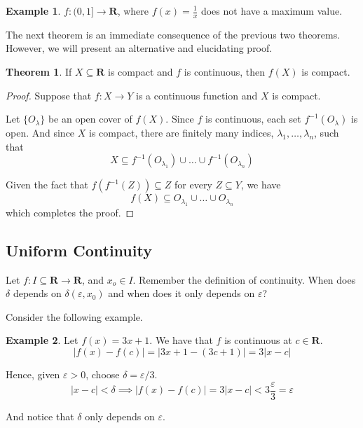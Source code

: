 \documentclass[12pt,a4paper]{article}
\theoremstyle{definition}
\newtheorem{theorem}{Theorem}[section]
\newtheorem{example}{Example}[section]
\begin{document}
\begin{example}
	$f:(0,1] \longrightarrow \textbf{R}$, where $f(x) = \frac{1}{x}$ does not have a maximum value.
\end{example}

The next theorem is an immediate consequence of the previous two theorems. However, we will present an alternative and elucidating proof.

\newpage

\begin{theorem}
	If $X \subseteq \textbf{R}$ is compact and $f$ is continuous, then $f(X)$ is compact.
\end{theorem}

\begin{proof}
	Suppose that $f : X \longrightarrow Y$ is a continuous function and $X$ is compact. 
	
	Let $\{ O_\lambda \}$ be an open cover of $f(X)$. Since $f$ is continuous, each set $f^{-1}(O_\lambda)$ is open. And since $X$ is compact, there are finitely many indices, $\lambda_1, \ldots, \lambda_n$, such that
	\[
		X \subseteq f^{-1}(O_{\lambda_1}) \cup \ldots \cup f^{-1}(O_{\lambda_n})
	\]
	
	Given the fact that $f(f^{-1}(Z))\subseteq Z$ for every $Z \subseteq Y$, we have
	\[
		f(X) \subseteq O_{\lambda_1} \cup \ldots \cup O_{\lambda_n}
	\]
	which completes the proof.
\end{proof}

\subsection{Uniform Continuity}

Let $f : I \subseteq \textbf{R} \longrightarrow \textbf{R}$, and $x_o \in I$. Remember the definition of continuity. When does $\delta$ depends on $\delta (\varepsilon, x_0)$ and when does it only depends on $\varepsilon$? 

Consider the following example.

\begin{example}
	Let $f(x) = 3x+1$. We have that $f$ is continuous at $c \in \textbf{R}$.
	\[
		| f(x) - f(c) | = | 3x+1 - (3c+1) | = 3 |x-c|
	\]
	
	Hence, given $\varepsilon > 0$, choose $\delta = \varepsilon/3$.
	\[
		| x - c | < \delta \implies | f(x) - f(c) | = 3 |x-c| < 3 \frac{\varepsilon}{3} = \varepsilon
	\]
	
	And notice that $\delta$ only depends on $\varepsilon$.
\end{example}
\end{document}
